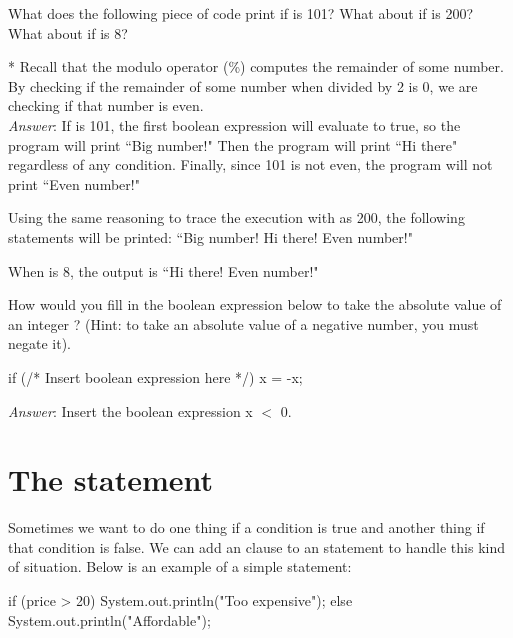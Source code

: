 \begin{example}
What does the following piece of code print if  is 101? What about if  is 200? What about if  is 8?


* Recall that the modulo operator (\%) computes the remainder of some number. By checking if the remainder of some number when divided by 2 is 0, we are checking if that number is even. \\

\emph{Answer}: If  is 101, the first boolean expression will evaluate to true, so the program will print ``Big number!" Then the program will print ``Hi there" regardless of any condition. Finally, since 101 is not even, the program will not print ``Even number!"

Using the same reasoning to trace the execution with  as 200, the following statements will be printed: ``Big number! Hi there! Even number!"

When  is 8, the output is ``Hi there! Even number!"
\end{example}

\begin{example}
How would you fill in the boolean expression below to take the absolute value of an integer ? (Hint: to take an absolute value of a negative number, you must negate it).

\begin{code}
if (/* Insert boolean expression here */) {
    x = -x;
} 
\end{code}

\emph{Answer}: Insert the boolean expression x $<$ 0.
\end{example}

\section{The  statement}
Sometimes we want to do one thing if a condition is true and another thing if that condition is false. We can add an  clause to an  statement to handle this kind of situation. Below is an example of a simple  statement:

\begin{code}
if (price > 20) {
    System.out.println("Too expensive");
} else {
    System.out.println("Affordable");
}
\end{code}

